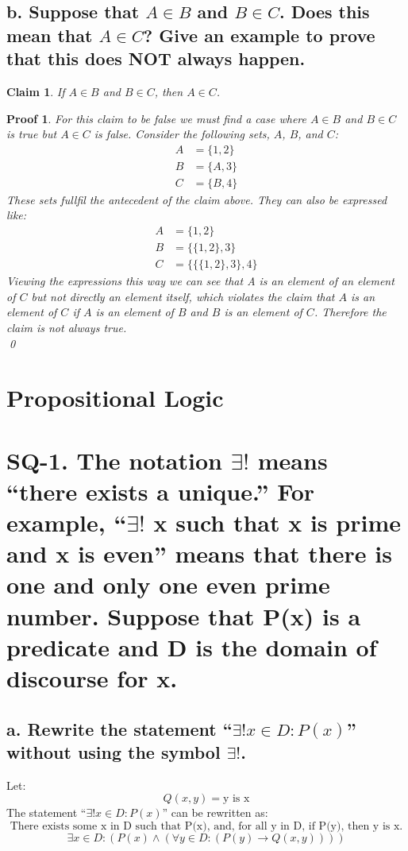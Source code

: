 \documentclass{article}
\newtheorem*{claim}{Claim}
\newtheorem*{poof}{Proof}
\begin{document}
\subsection*{b. Suppose that $A \in B$ and $B \in C$. Does this mean that $A \in C$? Give an example to prove that this does NOT always happen.}
\begin{claim}
    If $A \in B$ and $B \in C$, then $A \in C$.
\end{claim}
\begin{poof}
    For this claim to be false we must find a case where $A \in B$ and $B \in C$ is true but $A \in C$ is false. Consider the following sets, $A$, $B$, and $C$:
    \begin{align*}
        A &= \{1,2\}\\
        B&= \{A,3\}\\
        C&=\{B,4\}
    \end{align*}  
    These sets fullfil the antecedent of the claim above. They can also be expressed like:
    \begin{align*}
        A &= \{1,2\}\\
        B&= \{\{1,2\},3\}\\
        C&=\{\{\{1,2\},3\},4\}
    \end{align*}
    Viewing the expressions this way we can see that A is an element of an element of $C$ but not directly an element itself, which violates the claim that $A$ is an element of $C$ if $A$ is an element of $B$ and $B$ is an element of $C$. Therefore the claim is not always true.\\  
    \qed
\end{poof}
\newpage
\section*{Propositional Logic}
\section*{SQ-1. The notation $\exists !$ means ``there exists a unique.'' For example, ``$\exists !$ x such that x is prime and x is even'' means that there is one and only one even prime number. Suppose that P(x) is a predicate and D is the domain of discourse for x.}
\subsection*{a. Rewrite the statement ``$\exists ! x \in D:P(x)$'' without using the symbol $\exists !$.}
Let:
\[Q(x,y) = \text{y is x}\]
The statement ``$\exists ! x \in D:P(x)$'' can be rewritten as:
\[\text{There exists some x in D such that P(x), and, for all y in D, if P(y), then y is x.}\]
\[\exists x \in D : (P(x) \wedge (\forall y \in D : (P(y) \rightarrow Q(x,y)))) \]
\end{document}
